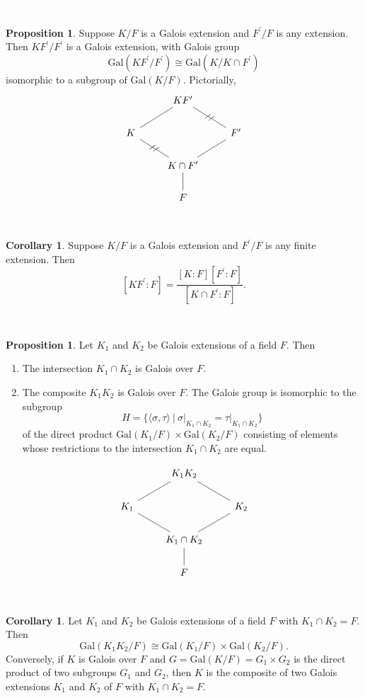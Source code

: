 \documentclass{article}
\theoremstyle{definition}
\newtheorem{prop}[thm]{Proposition}
\newtheorem{cor}[thm]{Corollary}
\newcommand{\nl}{\textcolor{white}{nothing}}
\newcommand{\p}{\prime}
\newcommand{\sig}{\sigma}
\newcommand{\Gal}{\text{Gal}}
\begin{document}
\nl

\begin{prop}
Suppose $K/F$ is a Galois extension and $F^\p/ F$ is any extension. Then $KF^\p/F^\p$ is a Galois extension, with Galois group
\[\Gal(KF^\p/F^\p)\cong \Gal(K/K\cap F^\p)\]
isomorphic to a subgroup of $\Gal(K/F)$. Pictorially,
\[
\begin{tikzcd}
 & KF^\p & \\
K\arrow[ur, dash] & & F^\p\arrow[ul, dash, "//"{anchor = center, sloped}]\\
 & K\cap F^\p\arrow[ur, dash]\arrow[ul, dash, "//"{anchor = center, sloped}] & \\
 & F\arrow[u, dash] &
\end{tikzcd}
\]
\end{prop}

\nl

\begin{cor}
Suppose $K/F$ is a Galois extension and $F^\p/F$ is any finite extension. Then 
\[[KF^\p:F] = \frac{[K:F][F^\p:F]}{[K\cap F^\p:F]}.\]
\end{cor}

\nl

\begin{prop}
Let $K_1$ and $K_2$ be Galois extensions of a field $F$. Then
\begin{enumerate}
\item The intersection $K_1\cap K_2$ is Galois over $F$.
\item The composite $K_1K_2$ is Galois over $F$. The Galois group is isomorphic to the subgroup
\[H = \{\langle \sig, \tau\rangle\ |\ \sig |_{K_1\cap K_2} = \tau|_{K_1\cap K_2}\}\]
of the direct product $\Gal(K_1/ F)\times \Gal(K_2 / F)$ consisting of elements whose restrictions to the intersection $K_1\cap K_2$ are equal.
\end{enumerate}
\[
\begin{tikzcd}
 & K_1K_2 & \\
K_1\arrow[ur, dash] & & K_2\arrow[ul, dash]\\
 & K_1\cap K_2\arrow[ur, dash]\arrow[ul, dash] & \\
 & F\arrow[u, dash] &
\end{tikzcd}
\]
\end{prop}

\nl

\begin{cor}
Let $K_1$ and $K_2$ be Galois extensions of a field $F$ with $K_1\cap K_2 = F$. Then
\[\Gal(K_1K_2/ F)\cong \Gal(K_1/ F)\times \Gal(K_2 / F).\]
Conversely, if $K$ is Galois over $F$ and $G = \Gal(K/F) = G_1\times G_2$ is the direct product of two subgroups $G_1$ and $G_2$, then $K$ is the composite of two Galois extensions $K_1$ and $K_2$ of $F$ with $K_1\cap K_2 = F$.
\end{cor}
\end{document}

